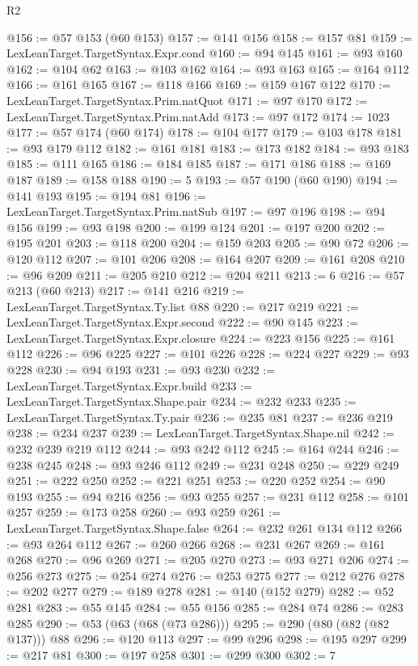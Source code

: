 \begin{lexlean}{R2}
\begin{coremodule}
@156 := @57 @153 (@60 @153)
@157 := @141 @156
@158 := @157 @81
@159 := LexLeanTarget.TargetSyntax.Expr.cond
@160 := @94 @145
@161 := @93 @160
@162 := @104 @62
@163 := @103 @162
@164 := @93 @163
@165 := @164 @112
@166 := @161 @165
@167 := @118 @166
@169 := @159 @167 @122
@170 := LexLeanTarget.TargetSyntax.Prim.natQuot
@171 := @97 @170
@172 := LexLeanTarget.TargetSyntax.Prim.natAdd
@173 := @97 @172
@174 := 1023
@177 := @57 @174 (@60 @174)
@178 := @104 @177
@179 := @103 @178
@181 := @93 @179 @112
@182 := @161 @181
@183 := @173 @182
@184 := @93 @183
@185 := @111 @165
@186 := @184 @185
@187 := @171 @186
@188 := @169 @187
@189 := @158 @188
@190 := 5
@193 := @57 @190 (@60 @190)
@194 := @141 @193
@195 := @194 @81
@196 := LexLeanTarget.TargetSyntax.Prim.natSub
@197 := @97 @196
@198 := @94 @156
@199 := @93 @198
@200 := @199 @124
@201 := @197 @200
@202 := @195 @201
@203 := @118 @200
@204 := @159 @203
@205 := @90 @72
@206 := @120 @112
@207 := @101 @206
@208 := @164 @207
@209 := @161 @208
@210 := @96 @209
@211 := @205 @210
@212 := @204 @211
@213 := 6
@216 := @57 @213 (@60 @213)
@217 := @141 @216
@219 := LexLeanTarget.TargetSyntax.Ty.list @88
@220 := @217 @219
@221 := LexLeanTarget.TargetSyntax.Expr.second
@222 := @90 @145
@223 := LexLeanTarget.TargetSyntax.Expr.closure
@224 := @223 @156
@225 := @161 @112
@226 := @96 @225
@227 := @101 @226
@228 := @224 @227
@229 := @93 @228
@230 := @94 @193
@231 := @93 @230
@232 := LexLeanTarget.TargetSyntax.Expr.build
@233 := LexLeanTarget.TargetSyntax.Shape.pair
@234 := @232 @233
@235 := LexLeanTarget.TargetSyntax.Ty.pair
@236 := @235 @81
@237 := @236 @219
@238 := @234 @237
@239 := LexLeanTarget.TargetSyntax.Shape.nil
@242 := @232 @239 @219 @112
@244 := @93 @242 @112
@245 := @164 @244
@246 := @238 @245
@248 := @93 @246 @112
@249 := @231 @248
@250 := @229 @249
@251 := @222 @250
@252 := @221 @251
@253 := @220 @252
@254 := @90 @193
@255 := @94 @216
@256 := @93 @255
@257 := @231 @112
@258 := @101 @257
@259 := @173 @258
@260 := @93 @259
@261 := LexLeanTarget.TargetSyntax.Shape.false
@264 := @232 @261 @134 @112
@266 := @93 @264 @112
@267 := @260 @266
@268 := @231 @267
@269 := @161 @268
@270 := @96 @269
@271 := @205 @270
@273 := @93 @271 @206
@274 := @256 @273
@275 := @254 @274
@276 := @253 @275
@277 := @212 @276
@278 := @202 @277
@279 := @189 @278
@281 := @140 (@152 @279)
@282 := @52 @281
@283 := @55 @145
@284 := @55 @156
@285 := @284 @74
@286 := @283 @285
@290 := @53 (@63 (@68 (@73 @286)))
@295 := @290 (@80 (@82 (@82 @137))) @88
@296 := @120 @113
@297 := @99 @296
@298 := @195 @297
@299 := @217 @81
@300 := @197 @258
@301 := @299 @300
@302 := 7

\end{coremodule}
\end{lexlean}
